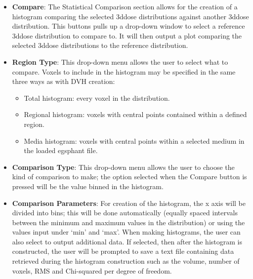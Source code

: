 \documentclass[12pt]{article}
\begin{document}
  \begin{itemize} 
  \item{\bf{Compare}}:
  The Statistical Comparison section allows for the creation of a histogram comparing the selected 3ddose distributions against another 3ddose distribution.  This buttons pulls up a drop-down window to select a reference 3ddose distribution to compare to.  It will then output a plot comparing the selected 3ddose distributions to the reference distribution.

  \item{\bf{Region Type}}:
  This drop-down menu allows the user to select what to compare.  Voxels to include in the histogram may be specified in the same three ways as with DVH creation:
  
  \begin{itemize}
  \item Total histogram:  every voxel in the distribution.
  \item Regional histogram:  voxels with central points contained within a defined region.
  \item Media histogram:  voxels with central points within a selected medium in the loaded egsphant file.
  \end{itemize}

  \item{\bf{Comparison Type}}:  This drop-down menu allows the user to choose the kind of comparison to make; the option selected when the Compare button is pressed will be the value binned in the histogram.

  \item{\bf{Comparison Parameters}}:   For creation of the histogram, the x axis will be divided into bins; this will be done automatically (equally spaced intervals between the minimum and maximum values in the distribution) or using the values input under `min' and `max'.  When making histograms, the user can also select to output additional data.  If selected, then after the histogram is constructed, the user will be prompted to save a text file containing data retrieved during the histogram construction such as the volume, number of voxels, RMS and Chi-squared per degree of freedom.
  \end{itemize}  
\end{document}
